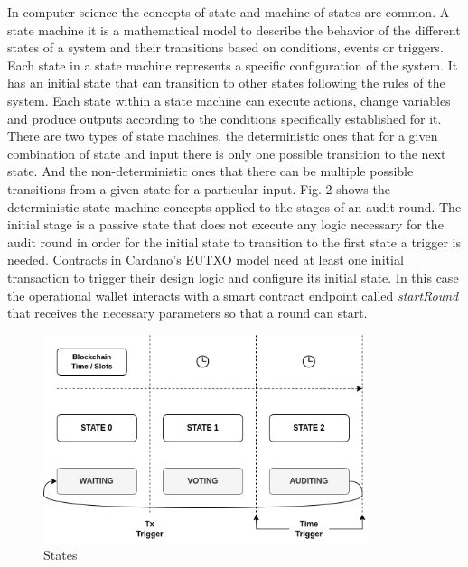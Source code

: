 \documentclass[12pt]{article}
\begin{document}
In computer science the concepts of state and machine of states are common. A state machine it is a mathematical model to describe the behavior of the different states of a system and their transitions based on conditions, events or triggers. Each state in a state machine represents a specific configuration of the system. It has an initial state that can transition to other states following the rules of the system. Each state within a state machine can execute actions, change variables and produce outputs according to the conditions specifically established for it. There are two types of state machines, the deterministic ones that for a given combination of state and input there is only one possible transition to the next state. And the non-deterministic ones that there can be multiple possible transitions from a given state for a particular input. Fig. 2 shows the deterministic state machine concepts applied to the stages of an audit round. The initial stage is a passive state that does not execute any logic necessary for the audit round in order for the initial state to transition to the first state a trigger is needed. Contracts in Cardano's EUTXO model need at least one initial transaction to trigger their design logic and configure its initial state. In this case the operational wallet interacts with a smart contract endpoint called \emph{startRound}  that receives the necessary parameters so that a round can start. 




\begin{figure}[ht]
  \centering
  \includegraphics[width=0.85\textwidth]{machine.png}
  \caption{States}
  \label{fig:States}
\end{figure} 
\end{document}
